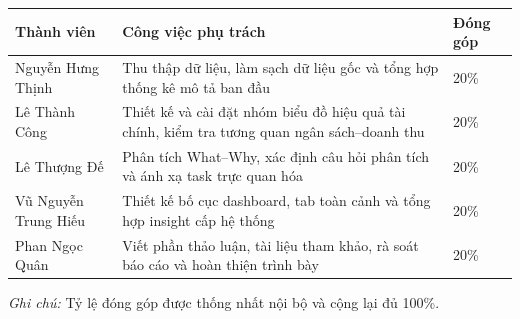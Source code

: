 \begin{center}
    \renewcommand{\arraystretch}{1.35}
    \begin{tabularx}{\textwidth}{|p{3.8cm}|X|p{2.2cm}|}
        \hline
        \textbf{Thành viên} & \textbf{Công việc phụ trách} & \textbf{Đóng góp} \\
        \hline
        Nguyễn Hưng Thịnh & Thu thập dữ liệu, làm sạch dữ liệu gốc và tổng hợp thống kê mô tả ban đầu & 20\% \\
        \hline
        Lê Thành Công & Thiết kế và cài đặt nhóm biểu đồ hiệu quả tài chính, kiểm tra tương quan ngân sách--doanh thu & 20\% \\
        \hline
        Lê Thượng Đế & Phân tích What--Why, xác định câu hỏi phân tích và ánh xạ task trực quan hóa & 20\% \\
        \hline
        Vũ Nguyễn Trung Hiếu & Thiết kế bố cục dashboard, tab toàn cảnh và tổng hợp insight cấp hệ thống & 20\% \\
        \hline
        Phan Ngọc Quân & Viết phần thảo luận, tài liệu tham khảo, rà soát báo cáo và hoàn thiện trình bày & 20\% \\
        \hline
    \end{tabularx}
\end{center}

\textit{Ghi chú:} Tỷ lệ đóng góp được thống nhất nội bộ và cộng lại đủ 100\%.